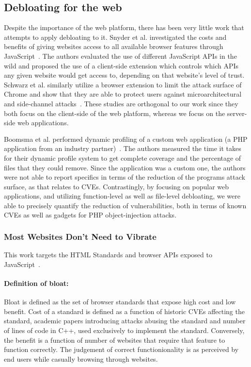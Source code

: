 \subsection{Debloating for the web}
Despite the importance of the web platform, there has been very little work that attempts to apply debloating to it. Snyder et al. investigated the costs and
benefits of giving websites access to all available browser features through
JavaScript~\cite{snyder2017vibrate}. The authors evaluated the use of different
JavaScript APIs in the wild and proposed the use of a client-side extension
which controls which APIs any given website would get access to, depending
on that website's level of trust. Schwarz et al. similarly utilize a browser
extension to limit the attack surface of Chrome and show that they are able
to protect users against microarchitectural and side-channel
attacks~\cite{Schwarz2018}. These studies are orthogonal to our work since
they both focus on the client-side of the web platform, whereas we focus on
the server-side web applications.


Boomsma et al. performed dynamic profiling of a custom web application
(a PHP application from an industry partner)~\cite{boomsma2012Dead}. The
authors measured the time it takes for their dynamic profile system to get
complete coverage and the percentage of files that they could remove. Since the
application was a custom one, the authors were not able to report specifics
in terms of the reduction of the programs attack surface, as that relates
to CVEs. Contrastingly, by focusing on popular web applications, and utilizing function-level as well as file-level debloating, we were
able to precisely quantify the reduction of vulnerabilities, both in terms
of known CVEs as well as gadgets for PHP object-injection attacks.

\subsubsection{Most Websites Don't Need to Vibrate}
This work targets the HTML Standards and browser APIs exposed to JavaScript~\cite{snyder2017vibrate}.
\paragraph{Definition of bloat:} Bloat is defined as the set of browser standards that expose high cost and low benefit. Cost of a standard is defined as a function of historic CVEs affecting the standard, academic papers introducing attacks abusing the standard and number of lines of code in C++, used exclusively to implement the standard. Conversely, the benefit is a function of number of websites that require that feature to function correctly. The judgement of correct functionionality is as perceived by end users while casually browsing through websites.
